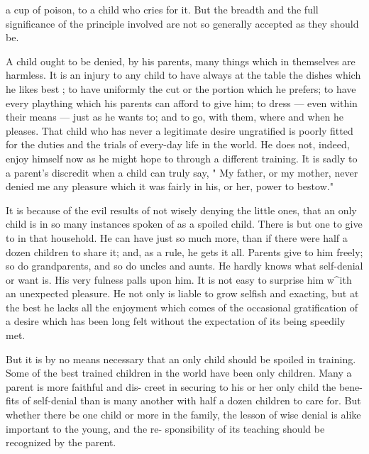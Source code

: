 \documentclass[
]{book}
\begin{document}
a cup of poison, to a child who cries for it. But the breadth and the full significance of the principle involved are not so generally accepted as they should be.

A child ought to be denied, by his parents, many things which in themselves are harmless. It is an injury to any child to have always at the table the dishes which he likes best ; to have uniformly the cut or the portion which he prefers; to have every plaything which his parents can afford to give him; to dress --- even within their means --- just as he wants to; and to go, with them, where and when he pleases. That child who has never a legitimate desire ungratified is poorly fitted for the duties and the trials of every-day life in the world. He does not, indeed, enjoy himself now as he might hope to through a different training. It is sadly to a parent's discredit when a child can truly say, " My father, or my mother, never denied me any pleasure which it was fairly in his, or her, power to bestow."

It is because of the evil results of not wisely denying the little ones, that an only child is in so many instances spoken of as a spoiled child. There is but one to give to in that household. He can have just so much more, than if there were half a dozen children to share it; and, as a rule, he gets it all. Parents give to him freely; so do grandparents, and so do uncles and aunts. He hardly knows what self-denial or want is. His very fulness palls upon him. It is not easy to surprise him w\^{}ith an unexpected pleasure. He not only is liable to grow selfish and exacting, but at the best he lacks all the enjoyment which comes of the occasional gratification of a desire which has been long felt without the expectation of its being speedily met.

But it is by no means necessary that an only child should be spoiled in training. Some of the best trained children in the world have been only children. Many a parent is more faithful and dis- creet in securing to his or her only child the bene- fits of self-denial than is many another with half a dozen children to care for. But whether there be one child or more in the family, the lesson of wise denial is alike important to the young, and the re- sponsibility of its teaching should be recognized by the parent.
\end{document}
